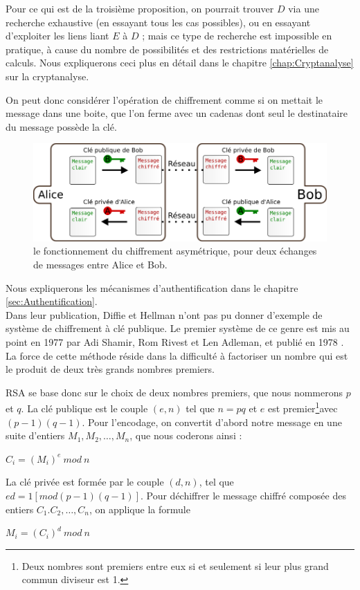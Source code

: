 Pour ce qui est de la troisième proposition, on pourrait trouver $D$
via une recherche exhaustive (en essayant tous les cas possibles), ou
en essayant d'exploiter les liens liant $E$ à $D$ ; mais ce type
de recherche est impossible en pratique, à cause du nombre de
possibilités et des restrictions matérielles de calculs. Nous
expliquerons ceci plus en détail dans le chapitre
\ref{chap:Cryptanalyse} sur la cryptanalyse.

On peut donc considérer l'opération de chiffrement comme si on
mettait le message dans une boite, que l'on ferme avec un cadenas
dont seul le destinataire du message possède la clé.

\begin{figure}[h]
  \begin{center}
    \includegraphics[scale=0.5]{images/ChiffrementAsymetrique.png}
  \end{center}
  \caption{le fonctionnement du chiffrement asymétrique, pour deux
    échanges de messages entre Alice et Bob.}
  \label{fig:ChiffrementSymetrique}
\end{figure}

Nous expliquerons les mécanismes d'authentification dans le 
chapitre \ref{sec:Authentification}. \\

\label{syst:RSA}
Dans leur publication, Diffie et Hellman n'ont pas pu donner
d'exemple de système de chiffrement à clé publique. Le premier
système de ce genre est mis au point en 1977 par Adi Shamir, Rom
Rivest et Len Adleman, et publié en 1978 \cite{RSAPaper}.
La force de cette méthode réside dans la difficulté à factoriser
un nombre qui est le produit de deux très grands nombres premiers. 

RSA se base donc sur le choix de deux nombres premiers, que nous
nommerons $p$ et $q$.
La clé publique est le couple $(e,n)$ tel que $n = p q$ et $e$ est
premier\footnote{Deux nombres sont premiers 
entre eux si et seulement si leur plus grand commun diviseur est 1.}avec $(p-1) (q-1)$.
Pour l'encodage, on convertit d'abord notre message en une suite
d'entiers $M_1, M_2, \dots, M_n$, %
que nous coderons ainsi :
\begin{center}
  $C_i = (M_i)^e ~mod~n$
\end{center}

La clé privée est formée par le couple $(d,n)$, tel que
$e d = 1 [mod (p-1) (q-1)]$.
Pour déchiffrer le message chiffré composée des entiers $C_1. C_2,
\dots, C_n$, on applique la formule
\begin{center}
  $M_i = (C_i)^d ~mod~n$
\end{center}


